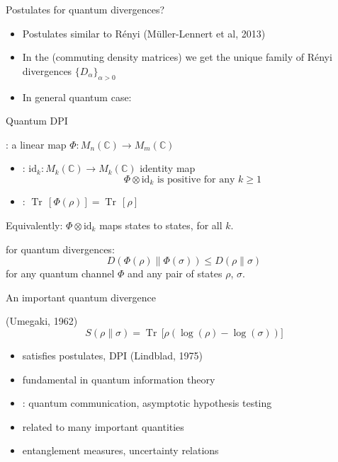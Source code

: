 \documentclass[mathserif]{beamer}
\newcommand{\<}{\langle}
\renewcommand{\>}{\rangle}
\newcommand{\Tr}{\operatorname{Tr}\,}
\begin{document}
\begin{frame}{Postulates for quantum divergences?}

\begin{itemize}
\item Postulates similar to R\'enyi (M\"uller-Lennert et al, 2013)
\vskip 5mm

\item In the   (commuting density matrices) we get 
the unique family of R\'enyi divergences
$\{D_\alpha\}_{\alpha>0}$

\vskip 5mm
\item In general quantum case: 


\end{itemize}


\end{frame}

\begin{frame}{Quantum DPI}


:  a linear map $\Phi: M_n(\mathbb C)\to M_m(\mathbb C)$


\medskip

\begin{itemize}
\item {}:  
$\mathrm{id}_k :M_k(\mathbb C)\to M_k(\mathbb C)$ identity map
\[
\Phi\otimes \mathrm{id}_k\text{ is
positive for any }k\ge 1
\]
\item {}: $\Tr[\Phi(\rho)]=\Tr[\rho]$
\end{itemize}

\medskip
Equivalently: $\Phi\otimes \mathrm{id}_k$ maps states to states, for all $k$.

\bigskip
{} for quantum divergences:
\[
D(\Phi(\rho)\|\Phi(\sigma))\le D(\rho\|\sigma)
\]
for any quantum channel $\Phi$ and any pair of states $\rho$, $\sigma$.
\end{frame}



\begin{frame}{An important quantum divergence}

  (Umegaki, 1962)
\[
S(\rho\| \sigma)=\Tr\bigl[\rho\left(\log(\rho)-\log(\sigma)\right)\bigr]
\]

\begin{itemize}
\item satisfies postulates, DPI (Lindblad, 1975)
\vskip 2mm
\item fundamental in quantum information theory
\vskip 2mm
\item {}:  quantum communication, asymptotic
hypothesis testing
\item related to many important quantities
\item entanglement measures, uncertainty relations
\end{itemize}



\end{frame}
\end{document}
